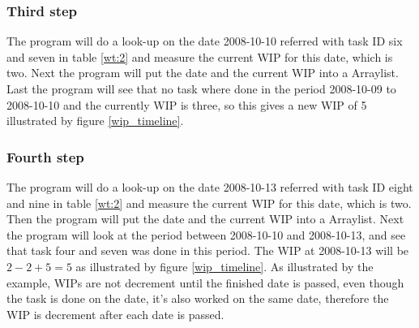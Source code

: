\documentclass[UKenglish]{ifimaster}  %
\begin{document}
\subsubsection{Third step}
The program will do a look-up on the date 2008-10-10 referred with task ID six and seven in table \ref{wt:2}  and measure the current WIP for this date, which is two. Next the program will put the date and the current WIP into a Arraylist.
Last the program will see that no task where done in the period 2008-10-09 to 2008-10-10 and the currently WIP is three, so this gives a new WIP of 5 illustrated by figure \ref{wip_timeline}. 

\subsubsection{Fourth step}
The program will do a look-up on the date 2008-10-13 referred with task ID eight and nine in table \ref{wt:2}  and measure the current WIP for this date, which is two. Then the program will put the date and the current WIP into a Arraylist. 
Next the program will look at the period between 2008-10-10 and 2008-10-13, and see that task four and seven was done in this period. The WIP at 2008-10-13 will be $2-2+5 = 5$ as illustrated by figure \ref{wip_timeline}. 
As illustrated by the example, WIPs are not decrement until the finished date is passed, even though the task is done on the date, it's also worked on the same date, therefore the WIP is decrement after each date is passed.
\fi



\newpage
\end{document}
